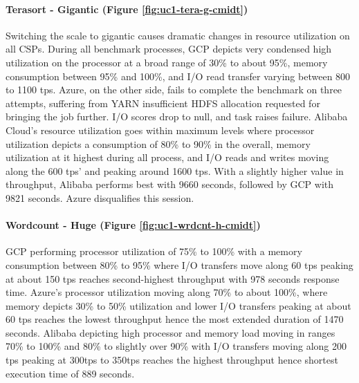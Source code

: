 \documentclass[review]{elsarticle}
\begin{document}
\paragraph{Terasort - Gigantic (Figure \ref{fig:uc1-tera-g-cmidt})}Switching the scale to gigantic causes dramatic changes in resource utilization on all CSPs. During all benchmark processes, GCP depicts very condensed high utilization on the processor at a broad range of 30\% to about 95\%, memory consumption between 95\% and 100\%, and I/O read transfer varying between 800 to 1100 tps. Azure, on the other side, fails to complete the benchmark on three attempts, suffering from YARN insufficient HDFS allocation requested for bringing the job further. I/O scores drop to null, and task raises failure. Alibaba Cloud's resource utilization goes within maximum levels where processor utilization depicts a consumption of 80\% to 90\% in the overall, memory utilization at it highest during all process, and I/O reads and writes moving along the 600 tps' and peaking around 1600 tps. With a slightly higher value in throughput, Alibaba performs best with 9660 seconds, followed by GCP with 9821 seconds. Azure disqualifies this session.

\paragraph{Wordcount - Huge (Figure \ref{fig:uc1-wrdcnt-h-cmidt})}GCP performing processor utilization of 75\% to 100\% with a memory consumption between 80\% to 95\% where I/O transfers move along 60 tps peaking at about 150 tps reaches second-highest throughput with 978 seconds response time. Azure's processor utilization moving along 70\% to about 100\%, where memory depicts 30\% to 50\% utilization and lower I/O transfers peaking at about 60 tps reaches the lowest throughput hence the most extended duration of 1470 seconds. Alibaba depicting high processor and memory load moving in ranges 70\% to 100\% and 80\% to slightly over 90\% with I/O transfers moving along 200 tps peaking at 300tps to 350tps reaches the highest throughput hence shortest execution time of 889 seconds.
\end{document}
